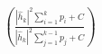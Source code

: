 \documentclass[preview]{standalone}
\begin{document}
\begin{align*}
\left(\frac{\left|{\hat{h}_k}\right|^2\sum_{i=1}^{k}p_i+ C}{\left|{\hat{h}_k}\right|^2\sum_{j=1}^{k-1}p_j+ C}\right)
\end{align*}
\end{document}
